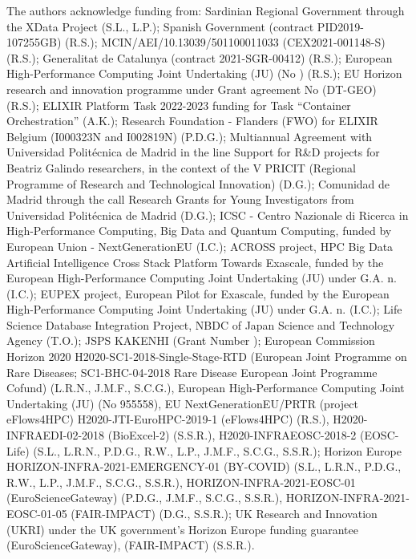 The authors acknowledge funding from:
  Sardinian Regional Government through the XData Project (S.L., L.P.);
  Spanish Government (contract PID2019-107255GB) (R.S.);
  MCIN/AEI/10.13039/501100011033 (CEX2021-001148-S) (R.S.);
  Generalitat de Catalunya (contract 2021-SGR-00412) (R.S.);
  European High-Performance Computing Joint Undertaking (JU) (No 
  ) (R.S.);
  EU Horizon research and innovation programme under Grant agreement No 
   (DT-GEO) (R.S.);
  ELIXIR Platform Task 2022-2023 funding for Task ``Container Orchestration'' (A.K.);
  Research Foundation - Flanders (FWO) for ELIXIR Belgium (I000323N and I002819N) (P.D.G.);
  Multiannual Agreement with Universidad Politécnica de Madrid in the line Support for R\&D projects for Beatriz Galindo researchers, in the context of the V PRICIT (Regional Programme of Research and Technological Innovation) (D.G.);
  Comunidad de Madrid through the call Research Grants for Young Investigators from Universidad Politécnica de Madrid (D.G.);
  ICSC - Centro Nazionale di Ricerca in High-Performance Computing, Big Data and Quantum Computing, funded by European Union - NextGenerationEU (I.C.);
  ACROSS project, HPC Big Data Artificial Intelligence Cross Stack Platform Towards Exascale, funded by the European High-Performance Computing Joint Undertaking (JU) under G.A. n. 
   (I.C.);
  EUPEX project, European Pilot for Exascale, funded by the European High-Performance Computing Joint Undertaking (JU) under G.A. n. 
   (I.C.);
  Life Science Database Integration Project, NBDC of Japan Science and
  Technology Agency (T.O.);
  JSPS KAKENHI (Grant Number );
  European Commission Horizon 2020
  H2020-SC1-2018-Single-Stage-RTD
 (European Joint Programme on Rare Diseases; SC1-BHC-04-2018 Rare Disease European Joint Programme Cofund) (L.R.N., J.M.F., S.C.G.),
    European High-Performance Computing Joint Undertaking (JU) (No 955558),
  EU NextGenerationEU/PRTR (project eFlows4HPC)
  H2020-JTI-EuroHPC-2019-1 
 (eFlows4HPC) (R.S.),
  H2020-INFRAEDI-02-2018 
  (BioExcel-2) (S.S.R.),
  H2020-INFRAEOSC-2018-2 
  (EOSC-Life) (S.L., L.R.N., P.D.G., R.W., L.P., J.M.F., S.C.G., S.S.R.);
  Horizon Europe
  HORIZON-INFRA-2021-EMERGENCY-01
 (BY-COVID) (S.L., L.R.N., P.D.G., R.W., L.P., J.M.F., S.C.G., S.S.R.),
  HORIZON-INFRA-2021-EOSC-01
 (EuroScienceGateway) (P.D.G., J.M.F., S.C.G., S.S.R.),
  HORIZON-INFRA-2021-EOSC-01-05
 (FAIR-IMPACT) (D.G., S.S.R.);
  UK Research and Innovation (UKRI) under the UK government's Horizon
  Europe funding guarantee
 (EuroScienceGateway),
 (FAIR-IMPACT) (S.S.R.).

